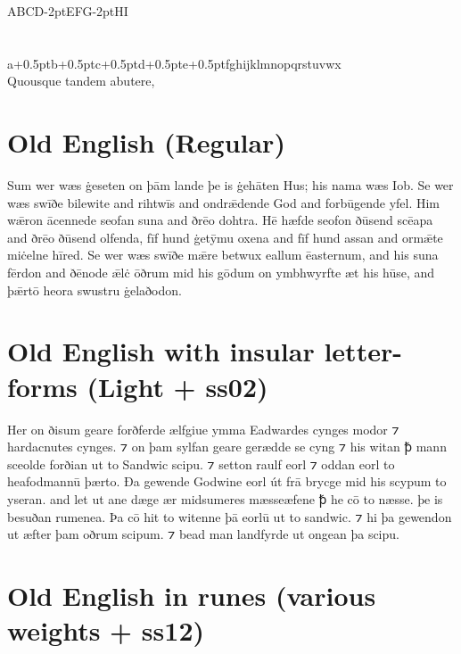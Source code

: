 \documentclass[12pt,letterpaper,openany]{book}
\begin{document}
{\fontsize{72pt}{72pt}\selectfont ABCD\kern-2ptEFG\kern-2ptHI\\[0.3ex]
\fontsize{58}{58}\selectfont{}\\[0.1ex]
\fontsize{48}{48}\selectfont{}\\[0.4ex]
\fontsize{36}{36}\selectfont{}a\kern+0.5ptb\kern+0.5ptc\kern+0.5ptd\kern+0.5pte\kern+0.5ptfghijklmnopqrstuvwx\\[0.1ex]
Quousque tandem abutere, \linebreak
\italslanted {}\linebreak
{} }


\section{Old English (Regular)}

{\large Sum wer wæs ġeseten on þām lande þe is ġehāten Hus; his nama wæs Iob. Se wer wæs swīðe bilewite and rihtwīs and ondrǣdende God and forbūgende yfel. Him wǣron ācennede seofan suna and ðrēo dohtra. Hē hæfde seofon ðūsend scēapa and ðrēo ðūsend olfenda, fīf hund ġetȳmu oxena and fīf hund assan and ormǣte miċelne hīred. Se wer wæs swīðe mǣre betwux eallum ēasternum, and his suna fērdon and ðēnode ǣlċ ōðrum mid his gōdum on ymbhwyrfte æt his hūse, and þǣrtō heora swustru ġelaðodon.}

\section{Old English with insular letter-forms (Light + ss02)}

{\large\light{}Her on ðisum geare forðferde ælfgiue ymma Eadwardes cynges modor ⁊ hardacnutes cynges. ⁊ on þam sylfan geare gerædde se cyng ⁊ his witan ꝥ mann sceolde forðian ut to Sandwic scipu. ⁊ setton raulf eorl ⁊ oddan eorl to heafodmannū þærto. Ða gewende Godwine eorl út frā brycge mid his scypum to yseran. and let ut ane dæge ær midsumeres mæsseæfene ꝥ he cō to næsse. þe is besuðan rumenea. Þa cō hit to witenne þā eorlū ut to sandwic. ⁊ hi þa gewendon ut æfter þam oðrum scipum. ⁊ bead man landfyrde ut ongean þa scipu.}

\section{Old English in runes (various weights + ss12)}
\end{document}
